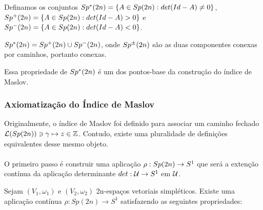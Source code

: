\documentclass{beamer}
\begin{document}
	\begin{frame}
		Definamos os conjuntos $Sp^{*}(2n) = \{ A \in Sp(2n): det(Id-A)\neq 0 \}$, $Sp^{+}(2n) = \{ A \in Sp(2n): det(Id-A)> 0 \}$ e  $Sp^{-}(2n) = \{ A \in Sp(2n): det(Id-A)< 0 \}$.
		
		\begin{lema}
			$Sp^{*}(2n) = Sp^{+}(2n)\cup Sp^{-}(2n)$, onde $Sp^{\pm}(2n)$ são as duas componentes conexas por caminhos, portanto conexas.
		\end{lema}
		
		Essa propriedade de $Sp^{*}(2n)$ é um dos pontos-base da construção do índice de Maslov.
	\end{frame}
	
	\begin{frame}
		\frametitle{Axiomatização do Índice de Maslov}
		
		Originalmente, o índice de Maslov foi definido para associar um caminho fechado $\mathcal{L}(Sp(2n)) \ni \gamma \mapsto z \in \mathbb{Z}$. Contudo, existe uma pluralidade de definições equivalentes desse mesmo objeto.
		\\~\\
		O primeiro passo é construir uma aplicação $\rho: Sp(2n)\to S^{1}$ que será a extenção contínua da aplicação determinante $det:\mathcal{U}\to S^{1}$ em $\mathcal{U}$.
		
		
		\begin{teorema}
			Sejam $(V_{1}, \omega_{1})$ e $(V_{2}, \omega_{2})$ 2n-espaços vetoriais simpléticos. Existe uma aplicação contínua $\rho:Sp(2n) \to S^{1}$ satisfazendo as seguintes propriedades:
			
		\end{teorema}
		
	\end{frame}
	
\end{document}
